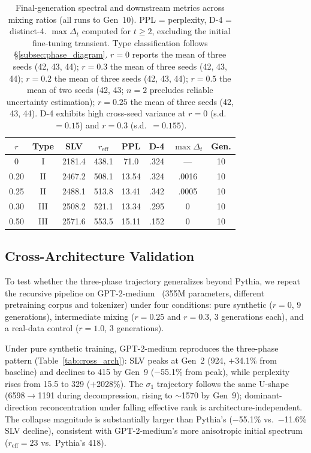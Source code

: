 \begin{table}[t]
\centering
\small
\setlength{\tabcolsep}{4pt}
\begin{tabular}{@{}cccccccc@{}}
\toprule
$r$ & Type & SLV & $r_{\text{eff}}$ & PPL & D-4 & $\max\Delta_t$ & Gen. \\
\midrule
0    & I   & 2181.4 & 438.1 & 71.0\phantom{0} & .324 & ---   & 10 \\
0.20 & II  & 2467.2 & 508.1 & 13.54 & .324 & .0016 & 10 \\
0.25 & II  & 2488.1 & 513.8 & 13.41 & .342 & .0005 & 10 \\
0.30 & III & 2508.2 & 521.1 & 13.34 & .295 & 0     & 10 \\
0.50 & III & 2571.6 & 553.5 & 15.11 & .152 & 0     & 10 \\
\bottomrule
\end{tabular}
\caption{Final-generation spectral and downstream metrics across mixing ratios (all runs to Gen~10). PPL = perplexity, D-4 = distinct-4. $\max\Delta_t$ computed for $t \geq 2$, excluding the initial fine-tuning transient. Type classification follows \S\ref{subsec:phase_diagram}. $r{=}0$ reports the mean of three seeds (42, 43, 44); $r{=}0.3$ the mean of three seeds (42, 43, 44); $r{=}0.2$ the mean of three seeds (42, 43, 44); $r{=}0.5$ the mean of two seeds (42, 43; $n{=}2$ precludes reliable uncertainty estimation); $r{=}0.25$ the mean of three seeds (42, 43, 44). D-4 exhibits high cross-seed variance at $r{=}0$ (s.d.\ $= 0.15$) and $r{=}0.3$ (s.d.\ $= 0.155$).}
\label{tab:phase_summary}
\end{table}

\subsection{Cross-Architecture Validation}
\label{subsec:cross_arch}

To test whether the three-phase trajectory generalizes beyond Pythia, we repeat the recursive pipeline on GPT-2-medium~\citep{radford2019language} (355M parameters, different pretraining corpus and tokenizer) under four conditions: pure synthetic ($r{=}0$, 9 generations), intermediate mixing ($r{=}0.25$ and $r{=}0.3$, 3 generations each), and a real-data control ($r{=}1.0$, 3 generations).

Under pure synthetic training, GPT-2-medium reproduces the three-phase pattern (Table~\ref{tab:cross_arch}): SLV peaks at Gen~2 (924, $+$34.1\% from baseline) and declines to 415 by Gen~9 ($-$55.1\% from peak), while perplexity rises from 15.5 to 329 ($+$2028\%).
The $\sigma_1$ trajectory follows the same U-shape (6598$\to$1191 during decompression, rising to ${\sim}$1570 by Gen~9); dominant-direction reconcentration under falling effective rank is architecture-independent.
The collapse magnitude is substantially larger than Pythia's ($-$55.1\% vs.\ $-$11.6\% SLV decline), consistent with GPT-2-medium's more anisotropic initial spectrum ($r_{\text{eff}}{=}23$ vs.\ Pythia's 418).

